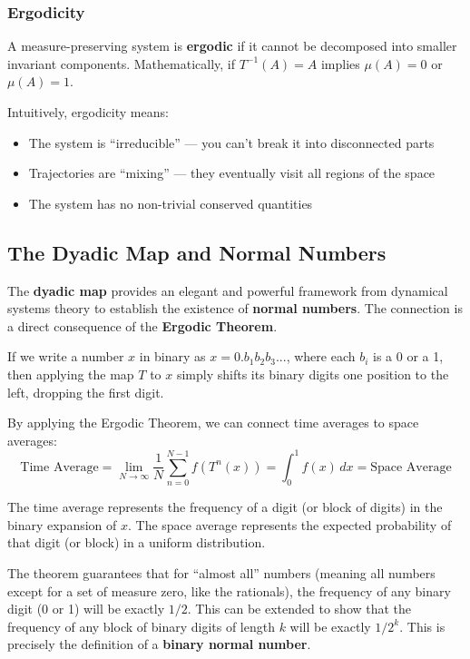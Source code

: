 \documentclass[12pt,a4paper]{article}
\begin{document}
\subsubsection{Ergodicity}
A measure-preserving system is \textbf{ergodic} if it cannot be decomposed into smaller invariant components. Mathematically, if $T^{-1}(A) = A$ implies $\mu(A) = 0$ or $\mu(A) = 1$.

Intuitively, ergodicity means:
\begin{itemize}
    \item The system is ``irreducible'' --- you can't break it into disconnected parts
    \item Trajectories are ``mixing'' --- they eventually visit all regions of the space
    \item The system has no non-trivial conserved quantities
\end{itemize}

\subsection{The Dyadic Map and Normal Numbers}

The \textbf{dyadic map} provides an elegant and powerful framework from dynamical systems theory to establish the existence of \textbf{normal numbers}. The connection is a direct consequence of the \textbf{Ergodic Theorem}.

If we write a number $x$ in binary as $x = 0.b_1b_2b_3...$, where each $b_i$ is a 0 or a 1, then applying the map $T$ to $x$ simply shifts its binary digits one position to the left, dropping the first digit.

By applying the Ergodic Theorem, we can connect time averages to space averages:
\[
\text{Time Average} = \lim_{N \to \infty} \frac{1}{N} \sum_{n=0}^{N-1} f(T^n(x)) = \int_0^1 f(x) \,dx = \text{Space Average}
\]

The time average represents the frequency of a digit (or block of digits) in the binary expansion of $x$. The space average represents the expected probability of that digit (or block) in a uniform distribution.

The theorem guarantees that for ``almost all'' numbers (meaning all numbers except for a set of measure zero, like the rationals), the frequency of any binary digit (0 or 1) will be exactly $1/2$. This can be extended to show that the frequency of any block of binary digits of length $k$ will be exactly $1/2^k$. This is precisely the definition of a \textbf{binary normal number}.
\end{document}

